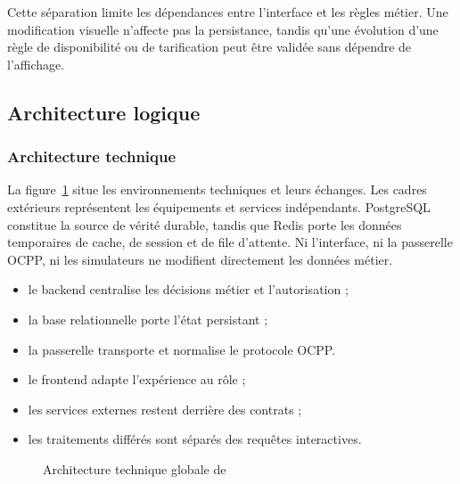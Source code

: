 Cette séparation limite les dépendances entre l'interface et les règles métier.
Une modification visuelle n'affecte pas la persistance, tandis qu'une évolution
d'une règle de disponibilité ou de tarification peut être validée sans dépendre
de l'affichage.

\subsection{Architecture logique}

\subsubsection{Architecture technique}

La figure~\ref{fig:technical-architecture} situe les environnements techniques et
leurs échanges. Les cadres extérieurs représentent les équipements et services
indépendants. PostgreSQL constitue la source de vérité durable, tandis que Redis
porte les données temporaires de cache, de session et de file d'attente. Ni
l'interface, ni la passerelle OCPP, ni les simulateurs ne modifient directement
les données métier.

\clearpage
\begin{scopebox}
\small
\begin{minipage}[t]{0.48\linewidth}
\begin{itemize}[leftmargin=5mm,nosep]
  \item le backend centralise les décisions métier et l'autorisation ;
  \item la base relationnelle porte l'état persistant ;
  \item la passerelle transporte et normalise le protocole OCPP.
\end{itemize}
\end{minipage}\hfill
\begin{minipage}[t]{0.48\linewidth}
\begin{itemize}[leftmargin=5mm,nosep]
  \item le frontend adapte l'expérience au rôle ;
  \item les services externes restent derrière des contrats ;
  \item les traitements différés sont séparés des requêtes interactives.
\end{itemize}
\end{minipage}
\end{scopebox}

\begin{figure}[H]
  \centering
  \resizebox{0.88\textwidth}{!}{}
  \caption{Architecture technique globale de \ProjectName{}}
  \label{fig:technical-architecture}
\end{figure}

